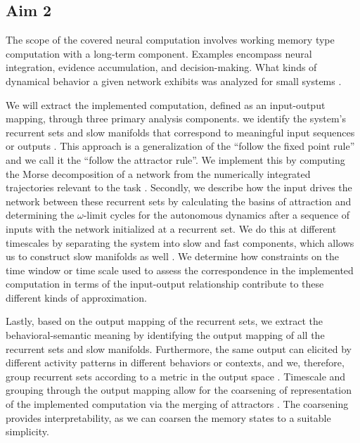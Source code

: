 \documentclass[12pt,letterpaper, onecolumn]{article}
\theoremstyle{definition}
\theoremstyle{remark}
\begin{document}
\subsection*{Aim 2}
The scope of the covered neural computation involves working memory type computation with a long-term component. Examples encompass neural integration, evidence accumulation, and decision-making.
What kinds of dynamical behavior a given network exhibits was analyzed for small systems \citep{beer1995ctrnn, beer1995interaction, beer1995computational, beer2006, beer2023}. %


We will extract the implemented computation, defined as an input-output mapping, through three primary analysis components.
we identify the system's recurrent sets and slow manifolds that correspond to meaningful input sequences or outputs \citep{goudar2018}. This approach is a generalization of the ``follow the fixed point rule'' and we call it the ``follow the attractor rule''. We implement this by computing the Morse decomposition of a network from the numerically integrated trajectories relevant to the task \citep{mischaikow1999, arai2009database}.
Secondly, we describe how the input drives the network between these recurrent sets by calculating the basins of attraction and determining the $\omega$-limit cycles for the autonomous dynamics after a sequence of inputs with the network initialized at a recurrent set. We do this at different timescales by separating the system into slow and fast components, which allows us to construct slow manifolds as well \citep{jones1995, kuehn2015, casey1996}.
We determine how constraints on the time window or time scale used to assess the correspondence in the implemented computation in terms of the input-output relationship contribute to these different kinds of approximation.


Lastly, based on the output mapping of the recurrent sets, we extract the behavioral-semantic meaning by identifying the output mapping of all the recurrent sets and slow manifolds. Furthermore, the same output can elicited by different activity patterns in different behaviors or contexts, and we, therefore, group recurrent sets according to a metric in the output space \citep{athalye2023, myers2022}.
Timescale and grouping through the output mapping allow for the coarsening of representation of the implemented computation via the merging of attractors \citep{braun2010}.
The coarsening provides interpretability, as we can coarsen the memory states to a suitable simplicity.
\end{document}
